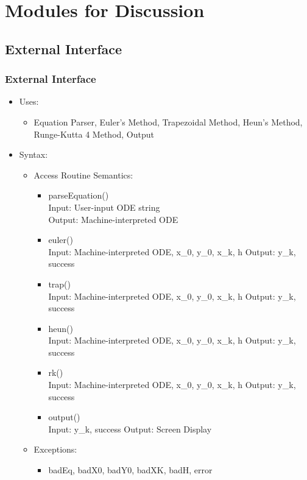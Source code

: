 \documentclass{beamer}
\begin{document}

\section{Modules for Discussion}



\subsection {External Interface}

\begin{frame}
\frametitle{External Interface}
\begin{itemize}
\item Uses:
	\begin{itemize}
		\item Equation Parser, Euler's Method, Trapezoidal Method, Heun's Method, Runge-Kutta 4 Method, Output
	\end{itemize}
\item Syntax:
	\begin{itemize}
		\item Access Routine Semantics:
			\begin{itemize}
			\item parseEquation()\\
				Input: User-input ODE string\\
				Output: Machine-interpreted ODE\\
			\item euler()\\
				Input: Machine-interpreted ODE, x\_0, y\_0, x\_k, h
				Output: y\_k, success
			\item trap()\\
				Input: Machine-interpreted ODE, x\_0, y\_0, x\_k, h
				Output: y\_k, success
			\item heun()\\
				Input: Machine-interpreted ODE, x\_0, y\_0, x\_k, h
				Output: y\_k, success
			\item rk()\\
				Input: Machine-interpreted ODE, x\_0, y\_0, x\_k, h
				Output: y\_k, success
			\item output()\\
				Input: y\_k, success
				Output: Screen Display
			\end{itemize}
		\item Exceptions:
			\begin{itemize}
			\item badEq, badX0, badY0, badXK, badH, error				
			\end{itemize}
	\end{itemize}
\end{itemize}
\end{frame}
\end{document}
